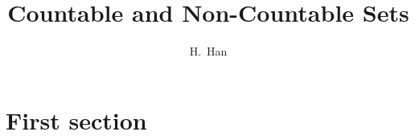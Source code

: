 \documentclass{beamer}
\title[Countable and Non-Countable Set] %
{Countable and Non-Countable Sets}
\author[H.~Han]
{H.~Han}
\begin{document}
\frame{\titlepage}




\section{First section}

%



%
%

\end{document}

